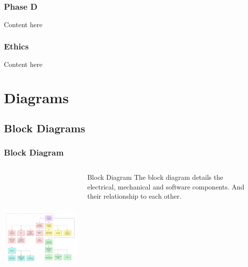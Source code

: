 \documentclass[aspectratio=169]{beamer}
\begin{document}
\begin{frame}
    \frametitle{Phase D}

    Content here

\end{frame}


\begin{frame}
    \frametitle{Ethics}

    Content here

\end{frame}


\section{Diagrams}
\subsection{Block Diagrams}
\begin{frame}
    \frametitle{Block Diagram}

    \begin{columns}
        \begin{column}{0.70\textwidth}
            \includegraphics[height=7cm]{BlockDiagram}
        \end{column}

        \begin{column}{0.30\textwidth}
            \begin{block}{Block Diagram}
                The block diagram details the electrical, mechanical and software components.
                And their relationship to each other.
            \end{block}
        \end{column}
    \end{columns}


\end{frame}
\end{document}
